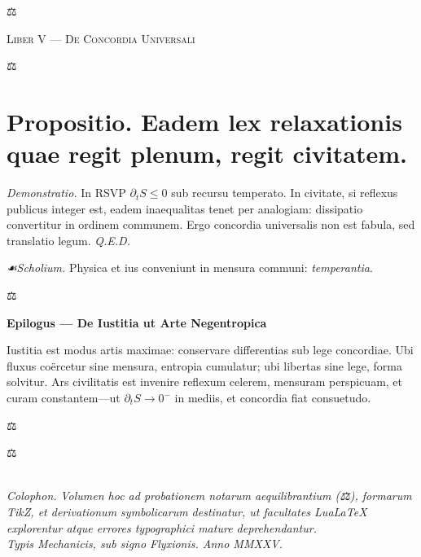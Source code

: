 \documentclass[12pt]{article}
\newcommand{\justitia}{\centerline{\Large ⚖}}
\newcommand{\scholia}{\textit{☙\;}}
\newcommand{\divider}{\vspace{1em}\justitia\vspace{1em}}
\newcommand{\Liber}[1]{\vspace{1ex}\begin{center}\Large\textsc{Liber #1}\end{center}\vspace{-0.5ex}\justitia\vspace{0.5ex}}
\begin{document}
\begin{center}
\end{center}

\divider

\Liber{V — De Concordia Universali}

\section*{Propositio. \; Eadem lex relaxationis quae regit plenum, regit civitatem.}

\textit{Demonstratio.} In RSVP \(\partial_t S \le 0\) sub recursu temperato. In civitate, si reflexus publicus integer est, eadem inaequalitas tenet per analogiam: dissipatio convertitur in ordinem communem. Ergo concordia universalis non est fabula, sed translatio legum. \textit{Q.E.D.}

\textit{\scholia Scholium.} Physica et ius conveniunt in mensura communi: \textit{temperantia}.

\divider

\begin{center}\textbf{Epilogus — De Iustitia ut Arte Negentropica}\end{center}

Iustitia est modus artis maximae: conservare differentias sub lege concordiae. Ubi fluxus coërcetur sine mensura, entropia cumulatur; ubi libertas sine lege, forma solvitur. Ars civilitatis est invenire reflexum celerem, mensuram perspicuam, et curam constantem—ut \(\partial_t S \to 0^-\) in mediis, et concordia fiat consuetudo.

\divider

\begin{center}
\justitia\\[0.5em]
\textit{Colophon.} \;
\textit{Volumen hoc ad probationem notarum aequilibrantium (⚖), formarum TikZ, et derivationum symbolicarum destinatur, ut facultates Lua\LaTeX{} explorentur atque errores typographici mature deprehendantur.}\\[0.25em]
\textit{Typis Mechanicis, sub signo Flyxionis. \; Anno MMXXV.}
\end{center}
\end{document}
